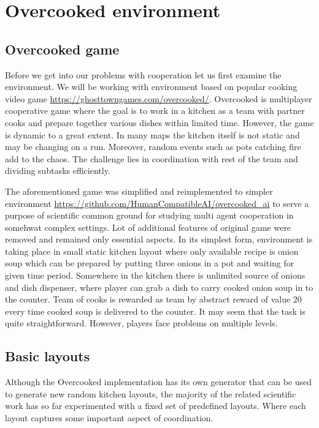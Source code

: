 \chapter{Overcooked environment}

\section{Overcooked game}
Before we get into our problems with cooperation let us first examine the environment. 
We will be working with environment based on popular cooking video game \url{https://ghosttowngames.com/overcooked/}.
Overcooked is multiplayer cooperative game where the goal is to work in a kitchen as a team with partner cooks and prepare together various dishes within limited time.
However, the game is dynamic to a great extent. In many maps the kitchen itself is not static and may be changing on a run. 
Moreover, random events such as pots catching fire add to the chaos. The challenge lies in coordination with rest of the team and dividing subtasks efficiently.

\par
The aforementioned game was simplified and reimplemented to simpler environment \url{https://github.com/HumanCompatibleAI/overcooked_ai} to serve a purpose of scientific common ground for studying multi agent cooperation in somehwat complex settings.
Lot of additional features of original game were removed and remained only essential aspects.
In its simplest form, environment is taking place in small static kitchen layout where only available recipe is onion soup which can be prepared by putting three onions in a pot and waiting for given time period.
Somewhere in the kitchen there is unlimited source of onions and dish dispenser, where player can grab a dish to carry cooked onion soup in to the counter.
Team of cooks is rewarded as team by abstract reward of value 20 every time cooked soup is delivered to the counter. 
It may seem that the task is quite straightforward. However, players face problems on multiple levels.

\section{Basic layouts}
Although the Overcooked implementation has its own generator that can be used to generate new random kitchen layouts, the majority of the related scientific work has so far experimented with a fixed set of predefined layouts. 
Where each layout captures some important aspect of coordination.



